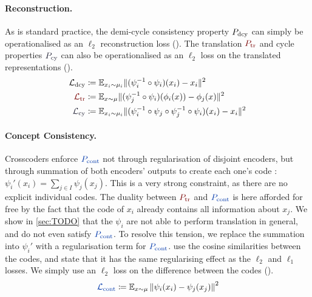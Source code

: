 \documentclass{article}
\begin{document}
\paragraph{Reconstruction.} As is standard practice, the demi-cycle consistency property $P_{\mathrm{dcy}}$ can simply be operationalised as an $\ell_2$ reconstruction loss (). The translation $\Ptr$ and cycle properties $\Pcy$ can also be operationalised as an $\ell_2$ loss on the translated representations ().
%
\begin{align}
\label{eq:reconstruction_loss}
\Ldcy &\coloneqq \E_{x_i \sim \mu_i} \| (\psi^{-1}_i \circ \psi_i) (x_i) - x_i \|^2\\
\label{eq:translation_loss}
\Ltr &\coloneqq \E_{x \sim \mu} \| (\psi^{-1}_j \circ \psi_i) (\phi_i(x)) - \phi_j(x) \|^2\\
\label{eq:cycle_loss}
\Lcy &\coloneqq \E_{x_i \sim \mu_i} \| (\psi^{-1}_i \circ \psi_j \circ \psi_j^{-1} \circ \psi_i) (x_i) - x_i \|^2
\end{align}

\paragraph{Concept Consistency.} Crosscoders \citep{TODO} enforce $\Pcont$ not through regularisation of disjoint encoders, but through summation of both encoders' outputs to create each one's code : $\psi_i'(x_i) = \sum_{j \in I} \psi_j(x_j)$. This is a very strong constraint, as there are no explicit individual codes. The duality between $\Ptr$ and $\Pcont$ is here afforded for free by the fact that the code of $x_i$ already contains all information about $x_j$. We show in \cref{sec:TODO} that the $\psi_i$ are not able to perform translation in general, and do not even satisfy $\Pcont$.%
To resolve this tension, we replace the summation into $\psi_i'$ with a regularisation term for $\Pcont$. \citet{TODO:dhimoila} use the cosine similarities between the codes, and state that it has the same regularising effect as the $\ell_2$ and $\ell_1$ losses. We simply use an $\ell_2$ loss on the difference between the codes ().
%
\begin{align}
\label{eq:contrastive_loss}
\Lcont \coloneqq \E_{x \sim \mu} \left\| \psi_i(x_i) - \psi_j(x_j) \right\|^2
\end{align}
\end{document}
